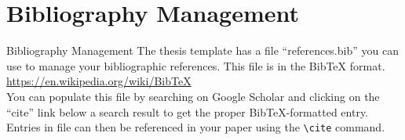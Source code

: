 \documentclass{beamer}
\begin{document}
\section{Bibliography Management}
\begin{frame}[fragile]{Bibliography Management}
  The thesis template has a file ``references.bib'' you can use
  to manage your bibliographic references. This file is in the BibTeX format.
  \url{https://en.wikipedia.org/wiki/BibTeX}\\

  You can populate this file by searching on Google Scholar and
  clicking on the ``cite'' link below a search result to get the proper
  BibTeX-formatted entry.\\

  Entries in file can then be referenced in your paper using
  the \verb|\cite| command.


\end{frame}
\end{document}
